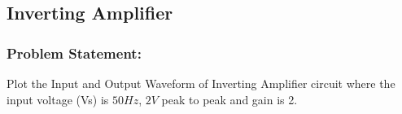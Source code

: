 






\pagebreak
\subsection{Inverting Amplifier}
\subsubsection{Problem Statement:}
Plot the Input and Output Waveform of Inverting Amplifier circuit where the input voltage (Vs) is $50Hz$, $2V$ peak to peak and gain is 2.
